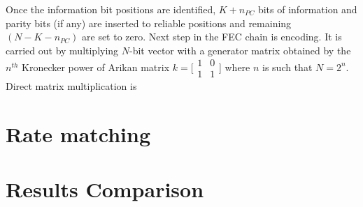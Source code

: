 Once the information bit positions are identified, $K + n_{PC}$ bits of information and parity bits (if any) are inserted to reliable positions and remaining  $(N-K-n_{PC})$ are set to zero. Next step in the FEC chain is encoding. It is carried out by multiplying $N$-bit vector with a generator matrix obtained by the $n^{th}$ Kronecker power of Arikan matrix $k = \big[\begin{smallmatrix} 1 & 0 \\ 1 & 1 \end{smallmatrix}$\big]  where $n$ is such that $N = 2^{n}$. Direct matrix multiplication is 

\section{Rate matching}

\section{Results Comparison}



